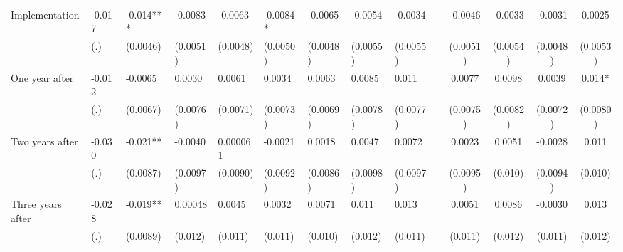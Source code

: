 \begin{tabular}{lccccrrrrrcccc}
Implementation & \multicolumn{1}{l}{-0.017} & \multicolumn{1}{l}{-0.014***} & \multicolumn{1}{l}{-0.0083} & \multicolumn{1}{l}{-0.0063} & \multicolumn{1}{l}{-0.0084*} & \multicolumn{1}{l}{-0.0065} & \multicolumn{1}{l}{-0.0054} & \multicolumn{1}{l}{-0.0034} &       & -0.0046 & -0.0033 & -0.0031 & 0.0025 \\
      & \multicolumn{1}{l}{(.)} & \multicolumn{1}{l}{(0.0046)} & \multicolumn{1}{l}{(0.0051)} & \multicolumn{1}{l}{(0.0048)} & \multicolumn{1}{l}{(0.0050)} & \multicolumn{1}{l}{(0.0048)} & \multicolumn{1}{l}{(0.0055)} & \multicolumn{1}{l}{(0.0055)} &       & (0.0051) & (0.0054) & (0.0048) & (0.0053) \\
One year after & \multicolumn{1}{l}{-0.012} & \multicolumn{1}{l}{-0.0065} & \multicolumn{1}{l}{0.0030} & \multicolumn{1}{l}{0.0061} & \multicolumn{1}{l}{0.0034} & \multicolumn{1}{l}{0.0063} & \multicolumn{1}{l}{0.0085} & \multicolumn{1}{l}{0.011} &       & 0.0077 & 0.0098 & 0.0039 & 0.014* \\
      & \multicolumn{1}{l}{(.)} & \multicolumn{1}{l}{(0.0067)} & \multicolumn{1}{l}{(0.0076)} & \multicolumn{1}{l}{(0.0071)} & \multicolumn{1}{l}{(0.0073)} & \multicolumn{1}{l}{(0.0069)} & \multicolumn{1}{l}{(0.0078)} & \multicolumn{1}{l}{(0.0077)} &       & (0.0075) & (0.0082) & (0.0072) & (0.0080) \\
Two years after & \multicolumn{1}{l}{-0.030} & \multicolumn{1}{l}{-0.021**} & \multicolumn{1}{l}{-0.0040} & \multicolumn{1}{l}{0.000061} & \multicolumn{1}{l}{-0.0021} & \multicolumn{1}{l}{0.0018} & \multicolumn{1}{l}{0.0047} & \multicolumn{1}{l}{0.0072} &       & 0.0023 & 0.0051 & -0.0028 & 0.011 \\
      & \multicolumn{1}{l}{(.)} & \multicolumn{1}{l}{(0.0087)} & \multicolumn{1}{l}{(0.0097)} & \multicolumn{1}{l}{(0.0090)} & \multicolumn{1}{l}{(0.0092)} & \multicolumn{1}{l}{(0.0086)} & \multicolumn{1}{l}{(0.0098)} & \multicolumn{1}{l}{(0.0097)} &       & (0.0095) & (0.010) & (0.0094) & (0.010) \\
Three years after & \multicolumn{1}{l}{-0.028} & \multicolumn{1}{l}{-0.019**} & \multicolumn{1}{l}{0.00048} & \multicolumn{1}{l}{0.0045} & \multicolumn{1}{l}{0.0032} & \multicolumn{1}{l}{0.0071} & \multicolumn{1}{l}{0.011} & \multicolumn{1}{l}{0.013} &       & 0.0051 & 0.0086 & -0.0030 & 0.013 \\
      & \multicolumn{1}{l}{(.)} & \multicolumn{1}{l}{(0.0089)} & \multicolumn{1}{l}{(0.012)} & \multicolumn{1}{l}{(0.011)} & \multicolumn{1}{l}{(0.011)} & \multicolumn{1}{l}{(0.010)} & \multicolumn{1}{l}{(0.012)} & \multicolumn{1}{l}{(0.011)} &       & (0.011) & (0.012) & (0.011) & (0.012) \\

\end{tabular}
